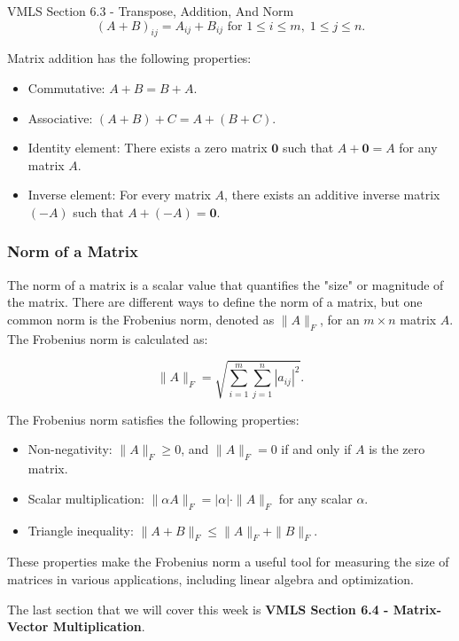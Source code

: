 \begin{notes}{VMLS Section 6.3 - Transpose, Addition, And Norm}
    \[
    (A + B)_{ij} = A_{ij} + B_{ij} \text{ for } 1 \leq i \leq m, \; 1 \leq j \leq n.
    \]
    
    Matrix addition has the following properties:
    
    \begin{itemize}
        \item Commutative: $A + B = B + A$.
        \item Associative: $(A + B) + C = A + (B + C)$.
        \item Identity element: There exists a zero matrix $\mathbf{0}$ such that $A + \mathbf{0} = A$ for any matrix $A$.
        \item Inverse element: For every matrix $A$, there exists an additive inverse matrix $(-A)$ such that $A + (-A) = \mathbf{0}$.
    \end{itemize}
    
    \subsubsection*{Norm of a Matrix}
    
    The norm of a matrix is a scalar value that quantifies the "size" or magnitude of the matrix. There are different ways to define the norm of a matrix, but one common norm is the Frobenius norm, denoted 
    as $\|A\|_F$, for an $m \times n$ matrix $A$. The Frobenius norm is calculated as:
    
    \[
    \|A\|_F = \sqrt{\sum_{i=1}^{m} \sum_{j=1}^{n} |a_{ij}|^2}.
    \]
    
    The Frobenius norm satisfies the following properties:
    
    \begin{itemize}
        \item Non-negativity: $\|A\|_F \geq 0$, and $\|A\|_F = 0$ if and only if $A$ is the zero matrix.
        \item Scalar multiplication: $\|\alpha A\|_F = |\alpha| \cdot \|A\|_F$ for any scalar $\alpha$.
        \item Triangle inequality: $\|A + B\|_F \leq \|A\|_F + \|B\|_F$.
    \end{itemize}
    
    These properties make the Frobenius norm a useful tool for measuring the size of matrices in various applications, including linear algebra and optimization.    
\end{notes}

The last section that we will cover this week is \textbf{VMLS Section 6.4 - Matrix-Vector Multiplication}.


